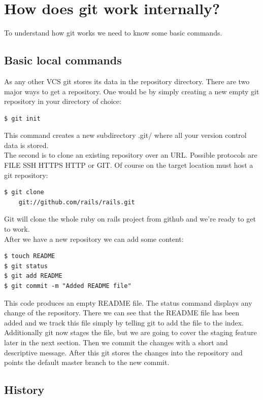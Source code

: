 \section{How does git work internally?}\label{howdoesgitwork}

To understand how git works we need to know some basic commands.

\subsection {Basic local commands}

As any other VCS git stores its data in the repository directory.
There are two major ways to get a repository.
One would be by simply creating a new empty git repository in your directory of choice:
\begin{lstlisting}
$ git init
\end{lstlisting}
This command creates a new subdirectory .git/ where all your version control
data is stored. \cite[Page 55]{gitinternals2008} \\
The second is to clone an existing repository over an URL. Possible protocols
are FILE SSH HTTPS HTTP or GIT. Of course on the target location must host a
git repository:
\begin{lstlisting}
$ git clone 
    git://github.com/rails/rails.git
\end{lstlisting}
Git will clone the whole ruby on rails project from github and we're
ready to get to work. \cite[Page 56]{gitinternals2008} \\

After we have a new repository we can add some content:
\begin{lstlisting}
$ touch README
$ git status
$ git add README
$ git commit -m "Added README file"
\end{lstlisting}

This code produces an empty README file. The status command displays any change
of the repository. There we can see that the README file has been added and we
track this file simply by telling git to add the file to the index. Additionally
git now stages the file, but we are going to cover the staging feature later in the next
section. Then we commit the changes with a short and descriptive message. After
this git stores the changes into the repository and points the default master
branch to the new commit. \cite[Page 55]{gitinternals2008} \\

\subsection {History}

